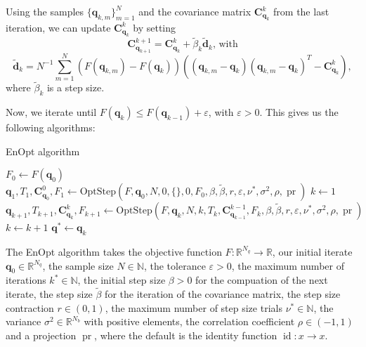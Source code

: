 Using the samples $\{\mathbf{q}_{k,m}\}_{m=1}^N$ and the covariance matrix $\mathbf{C}_{\mathbf{q}_k}^k$ from the last iteration, we can update $\mathbf{C}_{\mathbf{q}_k}^k$ by setting
\begin{displaymath}
\mathbf{C}_{\mathbf{q}_{k+1}}^{k+1}=\mathbf{C}_{\mathbf{q}_k}^k+\tilde{\beta}_k\tilde{\mathbf{d}}_k\text{, with}
\end{displaymath}
\begin{displaymath}
\tilde{\mathbf{d}}_k=N^{-1}\sum_{m=1}^N(F(\mathbf{q}_{k,m})-F(\mathbf{q}_k))((\mathbf{q}_{k,m}-\mathbf{q}_k)(\mathbf{q}_{k,m}-\mathbf{q}_k)^T-\mathbf{C}_{\mathbf{q}_k}^k),
\end{displaymath}
where $\tilde{\beta}_k$ is a step size.

Now, we iterate until $F(\mathbf{q}_k)\leq F(\mathbf{q}_{k-1})+\varepsilon$, with $\varepsilon>0$. This gives us the following algorithms:
\begin{algorithm}[H]%
\caption{EnOpt algorithm}
\begin{algorithmic}[1]
\State $F_{{0}}\gets F(\mathbf{q}_0)$
\State $\mathbf{q}_{1},T_{1},\mathbf{C}_{\mathbf{q}_{0}}^{0},F_{1}\gets\mathrm{OptStep}(F,\mathbf{q}_0,N,0,\{\},0,F_{0},\beta,\tilde{\beta},r,\varepsilon,\nu^*,\sigma^2,\rho,\operatorname{pr})$
\State $k\gets 1$
\State $\mathbf{q}_{k+1},T_{k+1},\mathbf{C}_{\mathbf{q}_{k}}^{k},F_{k+1}\gets\mathrm{OptStep}(F,\mathbf{q}_k,N,k,T_k,\mathbf{C}_{\mathbf{q}_{k-1}}^{k-1},F_k,\beta,\tilde{\beta},r,\varepsilon,\nu^*,\sigma^2,\rho,\operatorname{pr})$
\State $k\gets k+1$
\EndWhile
\State \Return $\mathbf{q}^*\gets\mathbf{q}_k$
\EndProcedure
\end{algorithmic}
\end{algorithm}
The EnOpt algorithm takes the objective function $F:\mathbb{R}^{N_q}\to\mathbb{R}$, our initial iterate $\mathbf{q}_0\in\mathbb{R}^{N_q}$, the sample size $N\in\mathbb{N}$, the tolerance $\varepsilon>0$, the maximum number of iterations $k^*\in\mathbb{N}$, the initial step size $\beta>0$ for the compuation of the next iterate, the step size $\tilde{\beta}$ for the iteration of the covariance matrix, the step size contraction $r\in(0,1)$, the maximum number of step size trials $\nu^*\in\mathbb{N}$, the variance $\sigma^2\in\mathbb{R}^{N_b}$ with positive elements, the correlation coefficient $\rho\in(-1,1)$ and a projection $\operatorname{pr}$, where the default is the identity function $\operatorname{id}:x\to x$.
